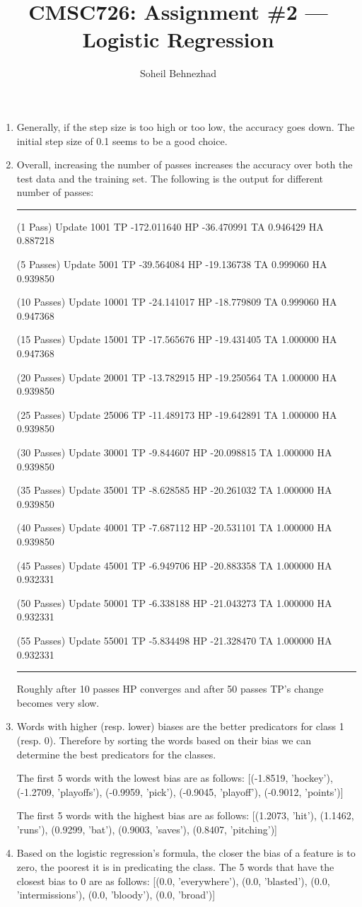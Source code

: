 \documentclass[letterpaper,11pt]{article}
\author{Soheil Behnezhad}
\title{CMSC726: Assignment \#2 --- Logistic Regression}
\begin{document}
\maketitle

\begin{enumerate}
\item Generally, if the step size is too high or too low, the accuracy goes down. The initial step size of 0.1 seems to be a good choice.
\item Overall, increasing the number of passes increases the accuracy over both the test data and the training set. The following is the output for different number of passes:

\rule{16cm}{1pt}

(1 Pass) Update 1001	TP -172.011640	HP -36.470991	TA 0.946429	HA 0.887218

(5 Passes) Update 5001	TP -39.564084	HP -19.136738	TA 0.999060	HA 0.939850

(10 Passes) Update 10001	TP -24.141017	HP -18.779809	TA 0.999060	HA 0.947368

(15 Passes) Update 15001	TP -17.565676	HP -19.431405	TA 1.000000	HA 0.947368

(20 Passes) Update 20001	TP -13.782915	HP -19.250564	TA 1.000000	HA 0.939850

(25 Passes) Update 25006	TP -11.489173	HP -19.642891	TA 1.000000	HA 0.939850

(30 Passes) Update 30001	TP -9.844607	HP -20.098815	TA 1.000000	HA 0.939850

(35 Passes) Update 35001	TP -8.628585	HP -20.261032	TA 1.000000	HA 0.939850

(40 Passes) Update 40001	TP -7.687112	HP -20.531101	TA 1.000000	HA 0.939850

(45 Passes) Update 45001	TP -6.949706	HP -20.883358	TA 1.000000	HA 0.932331

(50 Passes) Update 50001	TP -6.338188	HP -21.043273	TA 1.000000	HA 0.932331

(55 Passes) Update 55001	TP -5.834498	HP -21.328470	TA 1.000000	HA 0.932331

\rule{16cm}{1pt}

Roughly after 10 passes HP converges and after 50 passes TP's change becomes very slow.

\item Words with higher (resp. lower) biases are the better predicators for class 1 (resp. 0). Therefore by sorting the words based on their bias we can determine the best predicators for the classes.

The first 5 words with the lowest bias are as follows:
[(-1.8519, 'hockey'), (-1.2709, 'playoffs'), (-0.9959, 'pick'), (-0.9045, 'playoff'), (-0.9012, 'points')]

The first 5 words with the highest bias are as follows:
[(1.2073, 'hit'), (1.1462, 'runs'), (0.9299, 'bat'), (0.9003, 'saves'), (0.8407, 'pitching')]
\item Based on the logistic regression's formula, the closer the bias of a feature is to zero, the poorest it is in predicating the class. The 5 words that have the closest bias to 0 are as follows:
[(0.0, 'everywhere'), (0.0, 'blasted'), (0.0, 'intermissions'), (0.0, 'bloody'), (0.0, 'broad')]
\end{enumerate}
\end{document}
